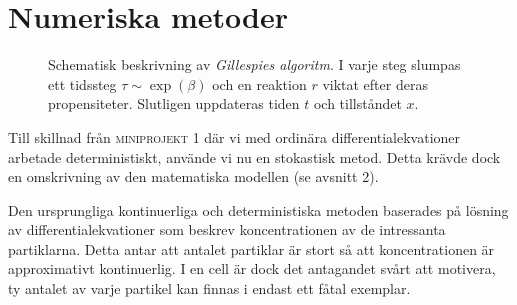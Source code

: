 \section{Numeriska metoder}
\label{sec:metoder}

\begin{figure}
	\centering
	\caption{Schematisk beskrivning av \emph{Gillespies algoritm}. I varje steg slumpas ett tidssteg $\tau \sim \exp(\beta)$ och en reaktion $r$ viktat efter deras propensiteter. Slutligen uppdateras tiden $t$ och tillståndet $x$.}
	\label{fig:gill}
\end{figure}

Till skillnad från \textsc{miniprojekt 1} där vi med ordinära
differentialekvationer arbetade deterministiskt, använde vi nu en
stokastisk metod. Detta krävde dock en omskrivning av den matematiska
modellen (se avsnitt 2).

Den ursprungliga kontinuerliga och deterministiska metoden baserades på
lösning av differentialekvationer som beskrev koncentrationen av de intressanta
partiklarna. Detta antar att antalet partiklar är stort så att koncentrationen
är approximativt kontinuerlig. I en cell är dock det antagandet svårt att
motivera, ty antalet av varje partikel kan finnas i endast ett fåtal exemplar.

